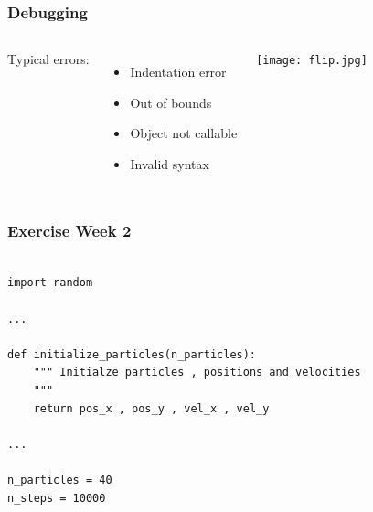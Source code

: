 \documentclass{beamer}
\begin{document}
\begin{frame}[fragile]

    \frametitle{Debugging}


    \begin{columns}[t]


    Typical errors:

    \begin{itemize}
        \item Indentation error
        \item Out of bounds
        \item Object not callable
        \item Invalid syntax
    \end{itemize}


        
            \texttt{[image: flip.jpg]}

    \end{columns}


\end{frame}



\begin{frame}[fragile]

    \frametitle{Exercise Week 2}

\begin{lstlisting}

import random

...

def initialize_particles(n_particles):
    """ Initialze particles , positions and velocities
    """
    return pos_x , pos_y , vel_x , vel_y

...

n_particles = 40
n_steps = 10000

\end{lstlisting}

\end{frame}




\end{document}
